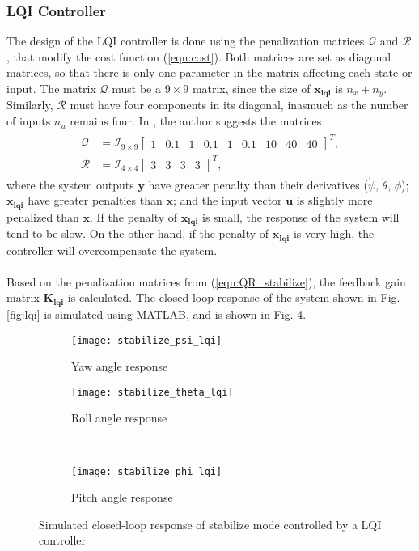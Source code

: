 \subsubsection{LQI Controller}
The design of the LQI controller is done using the penalization matrices $\mathcal{Q}$ and $\mathcal{R}$, that modify the cost function (\ref{eqn:cost}). Both matrices are set as diagonal matrices, so that there is only one parameter in the matrix affecting each state or input. The matrix $\mathcal{Q}$ must be a $9\times 9$ matrix, since the size of $\mathbf{x_{lqi}}$ is $n_x + n_y$. Similarly, $\mathcal{R}$ must have four components in its diagonal, inasmuch as the number of inputs $n_u$ remains four.
In \cite{Alsharif2017a}, the author suggests the matrices
\begin{align}
\label{eqn:QR_stabilize}
\begin{split}
\mathcal{Q} & = \mathcal{I}_{9 \times 9}\begin{bmatrix}
1 & 0.1 & 1 & 0.1 & 1 & 0.1 & 10 & 40 & 40
\end{bmatrix}^{T},\\
\mathcal{R} & = \mathcal{I}_{4 \times 4}\begin{bmatrix}
3 & 3 & 3 & 3
\end{bmatrix}^{T},
\end{split}
\end{align}
where the system outputs $\mathbf{y}$ have greater penalty than their derivatives ($\dot{\psi}$, $\dot{\theta}$, $\dot{\phi}$); $\mathbf{x_{lqi}}$ have greater penalties than $\mathbf{x}$; and the input vector $\mathbf{u}$ is slightly more penalized than $\mathbf{x}$. If the penalty of $\mathbf{x_{lqi}}$ is small, the response of the system will tend to be slow. On the other hand, if the penalty of $\mathbf{x_{lqi}}$ is very high, the controller will overcompensate the system.
\\\\
Based on the penalization matrices from (\ref{eqn:QR_stabilize}), the feedback gain matrix $\mathbf{K_{lqi}}$ is calculated. The closed-loop response of the system shown in Fig. \ref{fig:lqi} is simulated using MATLAB, and is shown in Fig. \ref{fig:stabilize_lqi}.
\begin{figure}[h]
\begin{subfigure}{.5\linewidth}
\centering
\texttt{[image: stabilize\_psi\_lqi]}
\caption{Yaw angle response}
\label{fig:stabilize_psi_lqi}
\end{subfigure}%
\begin{subfigure}{.5\linewidth}
\centering
\texttt{[image: stabilize\_theta\_lqi]}
\caption{Roll angle response}
\label{fig:stabilize_theta_lqi}
\end{subfigure}\\[1ex]
\begin{subfigure}{\linewidth}
\centering
\texttt{[image: stabilize\_phi\_lqi]}
\caption{Pitch angle response}
\label{fig:stabilize_phi_lqi}
\end{subfigure}
\caption{Simulated closed-loop response of stabilize mode controlled by a LQI controller}
\label{fig:stabilize_lqi}
\end{figure}

